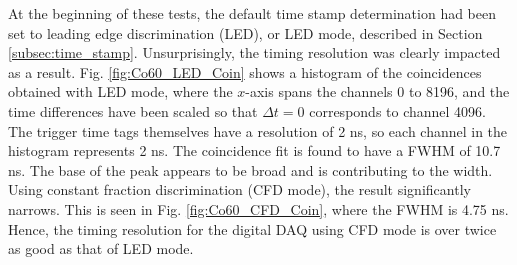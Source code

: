 At the beginning of these tests, the default time stamp determination had been set to leading edge discrimination (LED), or LED mode, described in Section \ref{subsec:time_stamp}. Unsurprisingly, the timing resolution was clearly impacted as a result. Fig. \ref{fig:Co60_LED_Coin} shows a histogram of the coincidences obtained with LED mode, where the $x$-axis spans the channels 0 to 8196, and the time differences have been scaled so that $\Delta t = 0$ corresponds to channel 4096. The trigger time tags themselves have a resolution of 2 ns, so each channel in the histogram represents 2 ns. The coincidence fit is found to have a FWHM of 10.7 ns. The base of the peak appears to be broad and is contributing to the width. Using constant fraction discrimination (CFD mode), the result significantly narrows. This is seen in Fig. \ref{fig:Co60_CFD_Coin}, where the FWHM is 4.75 ns. Hence, the timing resolution for the digital DAQ using CFD mode is over twice as good as that of LED mode.






